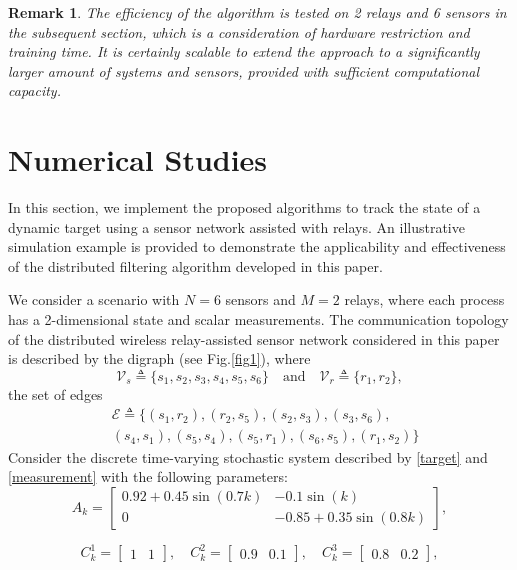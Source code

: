 \documentclass[twocolumn]{IEEEtran}
\newtheorem{remark}{Remark}
\begin{document}
\begin{remark}
The efficiency of the algorithm is tested on 2 relays and 6 sensors in the subsequent section, which is a
consideration of hardware restriction and training time. It is certainly scalable to extend the approach to a significantly larger amount of systems and sensors, provided with sufficient computational capacity.
\end{remark}

\section{Numerical Studies} \label{sec:experiment}
In this section, we implement the proposed algorithms to track the state of a dynamic target using a sensor network assisted with relays. An illustrative simulation example is provided to demonstrate the applicability and effectiveness of the distributed filtering algorithm developed in this paper.

We consider a scenario with $N=6$ sensors and $M=2$ relays, where each process has a 2-dimensional state and scalar measurements. The communication topology of the distributed wireless relay-assisted sensor network considered in this paper is described by the digraph (see Fig.\ref{fig1}), where
\[
\mathcal{V}_s \triangleq \{ s_1, s_2, s_3, s_4, s_5, s_6 \} \quad \text{and} \quad \mathcal{V}_r \triangleq \{ r_1, r_2 \},
\]
the set of edges
\begin{equation*}
\begin{split}
&\mathcal{E} \triangleq \{( s_1, r_2 ), ( r_2, s_5 ),  ( s_2, s_3 ),  ( s_3, s_6 ),\\
&( s_4, s_1 ),( s_5, s_4 ),( s_5, r_1 ),
( s_6, s_5 ), ( r_1, s_2 )\}
\end{split}
\end{equation*}
Consider the discrete time-varying stochastic system described by \eqref{target} and \eqref{measurement} with the following parameters:
\[
A_k = 
\begin{bmatrix}
0.92 + 0.45 \sin(0.7k) & -0.1 \sin(k) \\
0 & -0.85 + 0.35 \sin(0.8k)
\end{bmatrix},
\]

\[
C^{1}_{k} = 
\begin{bmatrix}
1 & 1
\end{bmatrix},\quad 
C^{2}_{k} = 
\begin{bmatrix}
0.9 & 0.1
\end{bmatrix},\quad 
C^{3}_{k} = 
\begin{bmatrix}
0.8 & 0.2
\end{bmatrix},
\]
\end{document}
